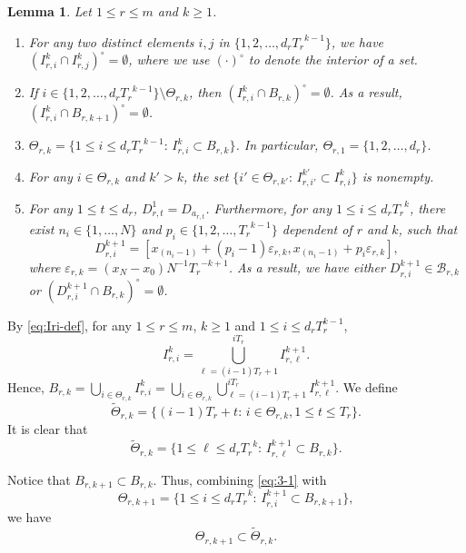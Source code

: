 \documentclass[11pt]{amsart}
\newtheorem{lem}[thm]{Lemma}
\theoremstyle{definition}
\theoremstyle{remark}
\numberwithin{equation}{section}
\newcommand{\mB}{{\mathcal B}}
\def\wdt{\widetilde}
\begin{document}
\begin{lem}\label{lem:Theta-simple-facts}
 Let $1\leq r\leq m$ and $k\geq 1$. 
 \begin{enumerate}
	  \item For any two distinct elements $i,j$ in $\{1,2,\ldots,d_r{T_r}^{k-1}\}$, we have $(I_{r,i}^k \cap I_{r,j}^k)^\circ =\emptyset$, where we use $(\cdot)^\circ$ to denote the interior of a set.
	  \item If $i\in\{1,2,\ldots,d_r{T_r}^{k-1}\}\setminus \Theta_{r,k}$, then $(I_{r,i}^k \cap B_{r,k})^\circ = \emptyset$. As a result, $(I_{r,i}^k \cap B_{r,k+1})^\circ = \emptyset$.
	  \item $\Theta_{r,k}=\big\{ 1 \leq  i \leq d_r {T_r}^{k-1}: \,I_{r,i}^k \subset B_{r,k}  \big\}$.	 In particular, $\Theta_{r,1}=\{1,2,\ldots,d_r\}$.
	  \item For any $i\in \Theta_{r,k}$ and $k'>k$, the set $\{i'\in \Theta_{r,k'}:\, I_{r,i'}^{k'}\subset I_{r,i}^k\}$ is nonempty.
	  \item For any $1\leq t\leq d_r$, $D_{r,t}^1=D_{a_{r,t}}$. Furthermore, for any $1\leq i\leq d_r{T_r}^k$, there exist $n_i\in\{1,\ldots,N\}$ and $p_i\in\{1,2,\ldots,{T_r}^{k-1}\}$ dependent of $r$ and $k$, such that
	  \begin{equation}\label{eq:Theta-simple-facts-1}
	    D_{r,i}^{k+1}=[x_{(n_i-1)}+(p_i-1)\varepsilon_{r,k},x_{(n_i-1)}+p_i\varepsilon_{r,k}],
	  \end{equation}
	 where $\varepsilon_{r,k}=(x_N-x_0)N^{-1}{T_r}^{-k+1}$. As a result, we have either $D_{r,i}^{k+1}\in \mB_{r,k}$ or $(D_{r,i}^{k+1}\cap B_{r,k})^\circ=\emptyset$.
  \end{enumerate}	
\end{lem}


By \eqref{eq:Iri-def}, for any $1\leq r\leq m$, $k\geq 1$ and $1\leq i\leq d_r T_r^{k-1}$,
\[
  I_{r,i}^k=\bigcup_{\ell=(i-1)T_r+1}^{iT_r} I_{r,\ell}^{k+1}.
\]
Hence,
$B_{r,k}=\bigcup_{i\in \Theta_{r,k}} I_{r,i}^k=\bigcup_{i\in \Theta_{r,k}} \bigcup_{\ell=(i-1)T_r+1}^{iT_r} I_{r,\ell}^{k+1}$.
We define
\[
  \wdt{\Theta}_{r,k}=\big\{(i-1)T_r+t: \, i\in \Theta_{r,k}, 1\leq t \leq T_r \big\}.
\]
It is clear that
\begin{equation}\label{eq:3-1}
	\wdt{\Theta}_{r,k} =\big\{ 1 \leq  \ell \leq d_r {T_r}^{k}:\, I_{r,\ell}^{k+1} \subset B_{r,k}   \big\}.
\end{equation}

Notice that $B_{r,k+1}\subset B_{r,k}$. Thus, combining \eqref{eq:3-1} with 
\begin{equation}\label{eq:3-2}
  \Theta_{r,k+1} =\big\{ 1 \leq  i \leq d_r {T_r}^{k}:\, I_{r,i}^{k+1} \subset B_{r,k+1}   \big\},
\end{equation}
we have
\begin{equation}\label{eq:wdt-relation}
	\Theta_{r,k+1}\subset \wdt{\Theta}_{r,k}.
\end{equation}
\end{document}
